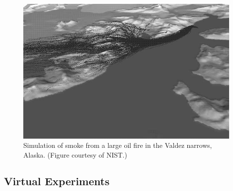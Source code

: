 \documentclass[graybox]{svmult}
\begin{document}
\begin{figure}[ht]
\includegraphics[width=\textwidth]{Fig_outdoor_plume}
\caption{Simulation of smoke from a large oil fire in the Valdez narrows, Alaska. (Figure courtesy of NIST.)}
\label{ALOFT}
\end{figure}



\subsection{Virtual Experiments}
\end{document}
